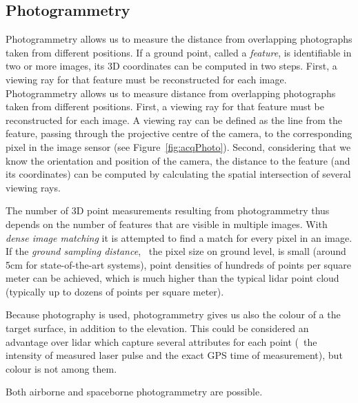 

\subsection{Photogrammetry}
Photogrammetry allows us to measure the distance from overlapping photographs taken from different positions. 
If a ground point, called a \emph{feature}, is identifiable in two or more images, its 3D coordinates can be computed in two steps. 
First, a viewing ray for that feature must be reconstructed for each image. 
Photogrammetry allows us to measure distance from overlapping photographs taken from different positions. 
First, a viewing ray for that feature must be reconstructed for each image. 
A viewing ray can be defined as the line from the feature, passing through the projective centre of the camera, to the corresponding pixel in the image sensor (see Figure~\ref{fig:acqPhoto}). 
Second, considering that we know the orientation and position of the camera, the distance to the feature (and its coordinates) can be computed by calculating the spatial intersection of several viewing rays.


The number of 3D point measurements resulting from photogrammetry thus depends on the number of features that are visible in multiple images.
With \emph{dense image matching} it is attempted to find a match for every pixel in an image. 
If the \emph{ground sampling distance}, \ie\ the pixel size on ground level, is small (around 5cm for state-of-the-art systems), point densities of hundreds of points per square meter can be achieved, which is much higher than the typical lidar point cloud (typically up to dozens of points per square meter). 

Because photography is used, photogrammetry gives us also the colour of a the target surface, in addition to the elevation.
This could be considered an advantage over lidar which capture several attributes for each point (\eg\ the intensity of measured laser pulse and the exact GPS time of measurement), but colour is not among them.

Both airborne and spaceborne photogrammetry are possible.

